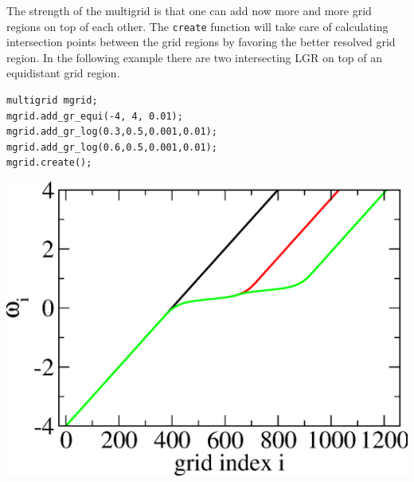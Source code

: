 The strength of the multigrid is that one can add now more and more grid regions on top of each other. The \texttt{create} function will take care of calculating intersection points between the grid regions by favoring the better resolved grid region. In the following example there are two intersecting LGR on top of an equidistant grid region. 
\\
\vspace{1cm}
\noindent\begin{minipage}[l]{0.6\textwidth}
\begin{lstlisting}
multigrid mgrid;
mgrid.add_gr_equi(-4, 4, 0.01);
mgrid.add_gr_log(0.3,0.5,0.001,0.01);
mgrid.add_gr_log(0.6,0.5,0.001,0.01);
mgrid.create();
\end{lstlisting}
\end{minipage}
\begin{minipage}[]{0.4\textwidth}
	\includegraphics[width=1.0\textwidth]{pics/multigrid_02.eps}
\end{minipage}

